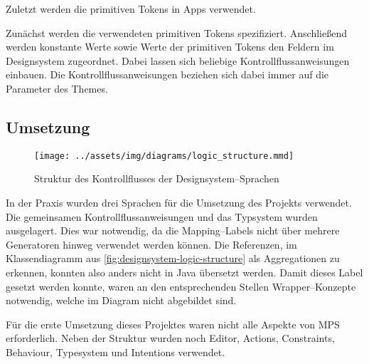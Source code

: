 Zuletzt werden die primitiven Tokens in Apps verwendet.

Zunächst werden die verwendeten primitiven Tokens spezifiziert.
Anschließend werden konstante Werte sowie Werte der primitiven Tokens den Feldern im Designsystem zugeordnet.
Dabei lassen sich beliebige Kontrollflussanweisungen einbauen.
Die Kontrollflussanweisungen beziehen sich dabei immer auf die Parameter des Themes.

\subsection{Umsetzung}\label{subsec:umsetzung}
\begin{figure}
    \texttt{[image: ../assets/img/diagrams/logic\_structure.mmd]}
    \caption{Struktur des Kontrollflusses der Designsystem--Sprachen}
    \label{fig:designsystem-logic-structure}
\end{figure}
In der Praxis wurden drei Sprachen für die Umsetzung des Projekts verwendet.
Die gemeinsamen Kontrollflussanweisungen und das Typsystem wurden ausgelagert.
Dies war notwendig, da die Mapping--Labels nicht über mehrere Generatoren hinweg verwendet werden können.
Die Referenzen, im Klassendiagramm aus \autoref{fig:designsystem-logic-structure} als Aggregationen zu erkennen, konnten also anders nicht in Java übersetzt werden.
Damit dieses Label gesetzt werden konnte, waren an den entsprechenden Stellen Wrapper--Konzepte notwendig, welche im Diagram nicht abgebildet sind.

Für die erste Umsetzung dieses Projektes waren nicht alle Aspekte von \ac{MPS} erforderlich.
Neben der Struktur wurden noch Editor, Actions, Constraints, Behaviour, Typesystem und Intentions verwendet.

